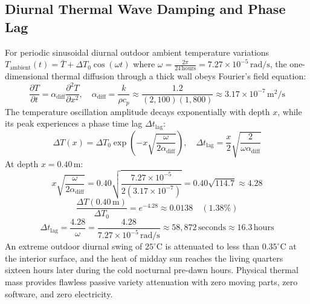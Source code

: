 \subsection{Diurnal Thermal Wave Damping and Phase Lag}
For periodic sinusoidal diurnal outdoor ambient temperature variations $T_{\mathrm{ambient}}(t) = \bar{T} + \Delta T_0 \cos(\omega t)$ where $\omega = \frac{2\pi}{24\,\mathrm{hours}} = 7.27 \times 10^{-5}\,\mathrm{rad/s}$, the one-dimensional thermal diffusion through a thick wall obeys Fourier's field equation:
\begin{equation}
\frac{\partial T}{\partial t} = \alpha_{\mathrm{diff}} \frac{\partial^2 T}{\partial x^2}, \quad \alpha_{\mathrm{diff}} = \frac{k}{\rho c_p} \approx \frac{1.2}{(2,100)(1,800)} \approx 3.17 \times 10^{-7}\,\mathrm{m^2/s}
\label{eq:fourier_diffusion}
\end{equation}
The temperature oscillation amplitude decays exponentially with depth $x$, while its peak experiences a phase time lag $\Delta t_{\mathrm{lag}}$:
\begin{equation}
\Delta T(x) = \Delta T_0 \exp\left( -x \sqrt{\frac{\omega}{2 \alpha_{\mathrm{diff}}}} \right), \quad \Delta t_{\mathrm{lag}} = \frac{x}{2} \sqrt{\frac{2}{\omega \alpha_{\mathrm{diff}}}}
\label{eq:thermal_damping_lag}
\end{equation}
At depth $x = 0.40\,\mathrm{m}$:
\begin{equation}
x \sqrt{\frac{\omega}{2 \alpha_{\mathrm{diff}}}} = 0.40 \sqrt{\frac{7.27 \times 10^{-5}}{2(3.17 \times 10^{-7})}} = 0.40 \sqrt{114.7} \approx 4.28
\label{eq:thermal_damping_arg}
\end{equation}
\begin{equation}
\frac{\Delta T(0.40\,\mathrm{m})}{\Delta T_0} = e^{-4.28} \approx 0.0138 \quad (1.38\%)
\label{eq:damping_ratio}
\end{equation}
\begin{equation}
\Delta t_{\mathrm{lag}} = \frac{4.28}{\omega} = \frac{4.28}{7.27 \times 10^{-5}\,\mathrm{rad/s}} \approx 58,872\,\mathrm{seconds} \approx 16.3\,\mathrm{hours}
\label{eq:phase_lag_hours}
\end{equation}
An extreme outdoor diurnal swing of $25^\circ\mathrm{C}$ is attenuated to less than $0.35^\circ\mathrm{C}$ at the interior surface, and the heat of midday sun reaches the living quarters sixteen hours later during the cold nocturnal pre-dawn hours. Physical thermal mass provides flawless passive variety attenuation with zero moving parts, zero software, and zero electricity.

